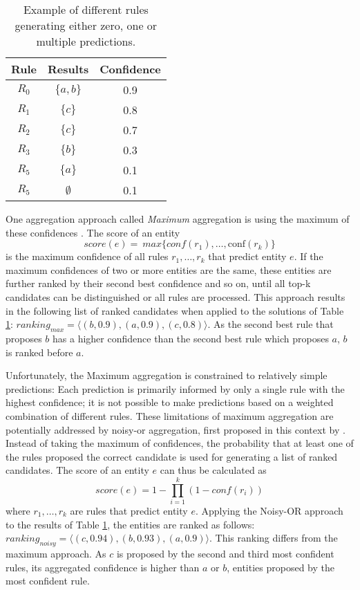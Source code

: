 \documentclass[akbc,twoside,11pt,lettersize]{article}
\begin{document}
\begin{table}[h]
\centering
\begin{tabular}{ccc}
\hline
    Rule & Results & Confidence \\ \hline
	$R_0$ & $\{a,b\}$ & 0.9 \\ \hline
	$R_1$ & $\{c\}$ & 0.8 \\ \hline
	$R_2$ & $\{c\}$ & 0.7 \\ \hline
	$R_3$ & $\{b\}$ & 0.3 \\ \hline
	$R_5$ & $\{a\}$ & 0.1 \\ \hline
	$R_5$ & $\emptyset$ & 0.1 \\ \hline
\end{tabular}
\caption{Example of different rules generating either zero, one or multiple predictions. }
\label{exSol}
\end{table}

One aggregation approach called \textit{Maximum} aggregation is using the maximum of these confidences \cite{meilicke_2019}. The score of an entity \[score(e) = \ max \{conf(r_1), \dots, \text{conf}(r_k)\}\]
is the maximum confidence of all rules $r_1, \dots, r_k$ that predict entity $e$. If the maximum confidences of two or more entities are the same, these entities are further ranked by their second best confidence and so on, until all top-k candidates can be distinguished or  all rules are processed. This approach results in the following list of ranked candidates when applied to the solutions of Table \ref{exSol}: $ranking_{max} = \langle(b, 0.9), (a, 0.9), (c, 0.8) \rangle$. As the second best rule that proposes $b$ has a higher confidence than the second best rule which proposes $a$, $b$ is ranked before $a$.

Unfortunately, the Maximum aggregation is constrained to relatively simple predictions: Each prediction is primarily informed by only a single rule with the highest confidence; it is not possible to make predictions based on a weighted combination of different rules. These limitations of maximum aggregation are potentially addressed by noisy-or aggregation, first proposed in this context by \cite{Galarraga2015}. Instead of taking the maximum of confidences, the probability that at least one of the rules proposed the correct candidate is used for generating a list of ranked candidates. The score of an entity $e$ can thus be calculated as \[score(e) = 1 - \prod_{i=1}^{k} (1 - conf(r_i))\] where $r_1, \dots, r_k$ are rules that predict entity $e$. Applying the Noisy-OR approach to the results of Table \ref{exSol}, the entities are ranked as follows: $ranking_{noisy} = \langle(c, 0.94), (b, 0.93), (a, 0.9)\rangle$. This ranking differs from the maximum approach. As $c$ is proposed by the second and third most confident rules, its aggregated confidence is higher than $a$ or $b$, entities proposed by the most confident rule.
\end{document}
